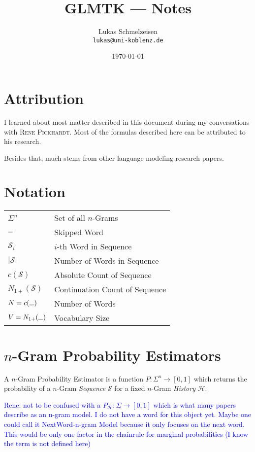 \documentclass[11pt,a4paper]{article}
\title{GLMTK --- Notes}
\author{Lukas Schmelzeisen \\ \texttt{lukas@uni-koblenz.de}}
\date{\today}
\newcommand{\Seq}{\mathcal{S}}
\newcommand{\Hist}{\mathcal{H}}
\newcommand{\Skp}{\rule{7pt}{.5pt}}
\newcommand{\rp}[1]{\textcolor{blue}{Rene: #1}}
\begin{document}
  \maketitle
  \tableofcontents
  \clearpage

  \section{Attribution}

  I learned about most matter described in this document during my
  conversations with \textsc{Rene Pickhardt}. Most of the formulas described
  here can be attributed to his research.

  Besides that, much stems from other language modeling research papers.

  \section{Notation}

  \begin{tabular}{ l l }
    $\Sigma^n$  & Set of all $n$-Grams \\
    $\Skp$ & Skipped Word \\
    $\Seq_i$ & $i$-th Word in Sequence \\
    $|\Seq|$ & Number of Words in Sequence \\
    $c(\Seq)$ & Absolute Count of Sequence \\
    $N_{1+}(\Seq)$ & Continuation Count of Sequence \\
    $N = c(\Skp)$ & Number of Words \\
    $V = N_{1+}(\Skp)$ & Vocabulary Size \\
  \end{tabular}

  \section{$n$-Gram Probability Estimators}

  A $n$-Gram Probability Estimator is a function $P :\Sigma^n \to [0,1]$ which
  returns the probability of a $n$-Gram \emph{Sequence} $\Seq$ for a fixed
  $n$-Gram \emph{History} $\Hist$.

  \rp{not to be confused with a $P_\Hist:\Sigma \to [0,1]$ which is what many
  papers describe as an n-gram model. I do not have a word for this object yet.
  Maybe one could call it NextWord-n-gram Model because it only focuses on the
  next word. This would be only one factor in the chainrule for marginal
  probabilities (I know the term is not defined here)}
\end{document}
